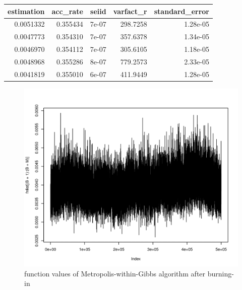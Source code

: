 \begin{center}
\begin{knitrout}
\color{fgcolor}
\begin{tabular}{r|r|r|r|r}
\hline
estimation & acc\_rate & seiid & varfact\_r & standard\_error\\
\hline
0.0051332 & 0.355434 & 7e-07 & 298.7258 & 1.28e-05\\
\hline
0.0047773 & 0.354310 & 7e-07 & 357.6378 & 1.34e-05\\
\hline
0.0046970 & 0.354112 & 7e-07 & 305.6105 & 1.18e-05\\
\hline
0.0048968 & 0.355286 & 8e-07 & 779.2573 & 2.33e-05\\
\hline
0.0041819 & 0.355010 & 6e-07 & 411.9449 & 1.28e-05\\
\hline
\end{tabular}


\end{knitrout}
\end{center}
\begin{figure}[H]
  \centering
\begin{knitrout}
\color{fgcolor}\begin{kframe}
\begin{alltt}
\hlstd{(fnlist[(B}\hlopt{+}\hlstd{)}\hlopt{:}\hlopt{+}\hlstd{M)],}\hlstd{=}\hlstd{)}
\end{alltt}
\end{kframe}
\includegraphics[width=\maxwidth]{figure/p9bplot-1} 

\end{knitrout}
		\caption{function values of Metropolis-within-Gibbs algorithm after burning-in}
\end{figure}
